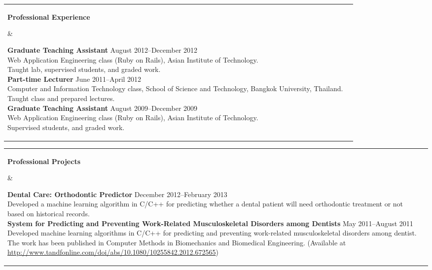 \documentclass[11pt]{article}
\makeatletter
\newcommand{\mysection}[2]{
  \noindent
  \begin{tabular}{@{}ll@{}}
    \parbox[t]{1.0in}{ \raggedright \bf #1 } &
    \parbox[t]{5.0in}{ #2 }\\
    \hspace{0.2in}
  \end{tabular}
}
\makeatother
\begin{document}
\mysection{Professional Experience}{ 
  {\bf Graduate Teaching Assistant} \hfill August 2012--December 2012\\
  Web Application Engineering class (Ruby on Rails), Asian Institute of
  Technology.\\
  Taught lab, supervised students, and graded work.\\

  {\bf Part-time Lecturer} \hfill June 2011--April 2012\\ 
  Computer and Information Technology class, School of Science and
  Technology, Bangkok University, Thailand.\\
  Taught class and prepared lectures.\\

  {\bf Graduate Teaching Assistant} \hfill August 2009--December 2009\\
  Web Application Engineering class (Ruby on Rails), Asian Institute of
  Technology.\\
  Supervised students, and graded work.
}

\mysection{Professional Projects}{

  {\bf Dental Care: Orthodontic Predictor} \hfill December 2012--February 2013\\
  Developed a machine learning algorithm in C/C++ for predicting whether
  a dental patient will need orthodontic treatment or not based on historical
  records.\\

  {\bf System for Predicting and Preventing Work-Related Musculoskeletal 
  Disorders among Dentists} \hfill May 2011--August 2011\\
  Developed machine learning algorithms in C/C++ for predicting and
  preventing work-related musculoskeletal disorders among dentist. The
  work has been published in Computer Methods in Biomechanics and
  Biomedical Engineering. (Available at
  \url{http://www.tandfonline.com/doi/abs/10.1080/10255842.2012.672565})

}
\end{document}
